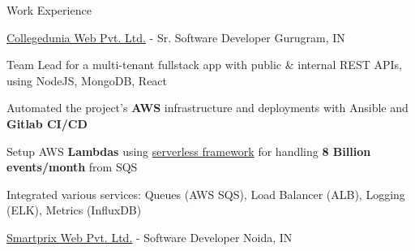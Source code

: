 \documentclass[../resume.tex]{subfiles}
\begin{document}
\begin{rSection}{Work Experience}
\begin{rSubsection}
    {\href{https://go.rohit.page/cd}{Collegedunia Web Pvt. Ltd.}}
    {  -  }
    {Sr. Software Developer}
    {Gurugram, IN}

    \item Team Lead for a multi-tenant fullstack app with public & internal REST APIs, using NodeJS, MongoDB, React
    \item Automated the project's \textbf{AWS} infrastructure and deployments with Ansible and \textbf{Gitlab CI/CD}
    \item Setup AWS \textbf{Lambdas} using \href{https://www.serverless.com/}{serverless framework} for handling \textbf{8 Billion events/month} from SQS
    \item Integrated various services: Queues (AWS SQS), Load Balancer (ALB), Logging (ELK), Metrics (InfluxDB)

\end{rSubsection}

\begin{rSubsection}
    {\href{https://go.rohit.page/smpx}{Smartprix Web Pvt. Ltd.}}
    {  -  }
    {Software Developer}
    {Noida, IN}


\end{rSubsection}
\end{rSection}
\end{document}
